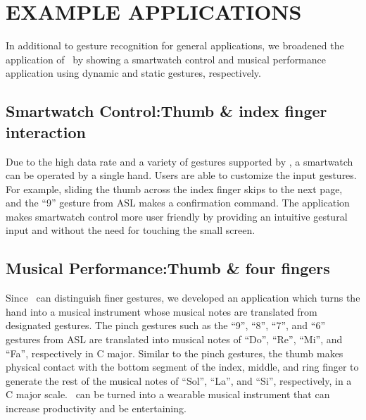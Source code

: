 \documentclass{sigchi}
\begin{document}
\section{EXAMPLE APPLICATIONS}
In additional to gesture recognition for general applications, we broadened the application of \getTitleName\ by showing a smartwatch control and musical performance application using dynamic and static gestures, respectively.

\subsection{Smartwatch Control:Thumb \& index finger interaction}

Due to the high data rate and a variety of gestures supported by \getTitleName, a smartwatch can be operated by a single hand. Users are able to customize the input gestures. For example, sliding the thumb across the index finger skips to the next page, and the ``9'' gesture from ASL makes a confirmation command. The application makes smartwatch control more user friendly by providing an intuitive gestural input and without the need for touching the small screen. 
    
\subsection{Musical Performance:Thumb \& four fingers}

Since \getTitleName\ can distinguish finer gestures, we developed an application which turns the hand into a musical instrument whose musical notes are translated from designated gestures. The pinch gestures such as the ``9'', ``8'', ``7'', and ``6'' gestures from ASL are translated into musical notes of ``Do'', ``Re'', ``Mi'', and ``Fa'', respectively in C major. Similar to the pinch gestures, the thumb makes physical contact with the bottom segment of the index, middle, and ring finger to generate the rest of the musical notes of ``Sol'', ``La'', and ``Si'', respectively, in a C major scale. \getTitleName\ can be turned into a wearable musical instrument that can increase productivity and be entertaining.
\end{document}
